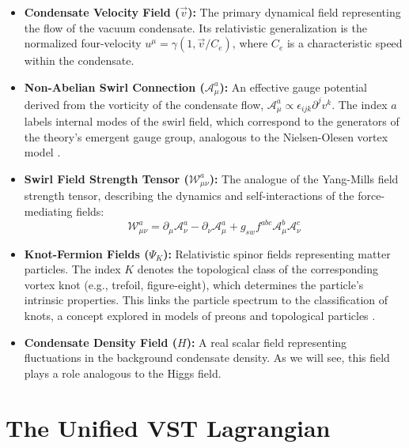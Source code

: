 \documentclass[12pt, a4paper]{article}
\begin{document}
    \begin{itemize}
        \item \textbf{Condensate Velocity Field ($\vec{v}$):} The primary dynamical field representing the flow of the vacuum condensate. Its relativistic generalization is the normalized four-velocity $u^\mu = \gamma(1, \vec{v}/C_e)$, where $C_e$ is a characteristic speed within the condensate.

        \item \textbf{Non-Abelian Swirl Connection ($\mathcal{A}_\mu^a$):} An effective gauge potential derived from the vorticity of the condensate flow, $\mathcal{A}_\mu^a \propto \epsilon_{ijk} \partial^j v^k$. The index $a$ labels internal modes of the swirl field, which correspond to the generators of the theory's emergent gauge group, analogous to the Nielsen-Olesen vortex model \cite{Nielsen1973}.

        \item \textbf{Swirl Field Strength Tensor ($\mathcal{W}_{\mu\nu}^a$):} The analogue of the Yang-Mills field strength tensor, describing the dynamics and self-interactions of the force-mediating fields:
        \begin{equation}
            \mathcal{W}_{\mu\nu}^a = \partial_\mu \mathcal{A}_\nu^a - \partial_\nu \mathcal{A}_\mu^a + g_{sw} f^{abc} \mathcal{A}_\mu^b \mathcal{A}_\nu^c
        \end{equation}

        \item \textbf{Knot-Fermion Fields ($\Psi_K$):} Relativistic spinor fields representing matter particles. The index $K$ denotes the topological class of the corresponding vortex knot (e.g., trefoil, figure-eight), which determines the particle's intrinsic properties. This links the particle spectrum to the classification of knots, a concept explored in models of preons and topological particles \cite{BilsonThompson2007}.

        \item \textbf{Condensate Density Field ($H$):} A real scalar field representing fluctuations in the background condensate density. As we will see, this field plays a role analogous to the Higgs field.
    \end{itemize}

    \section{The Unified VST Lagrangian}
\end{document}
